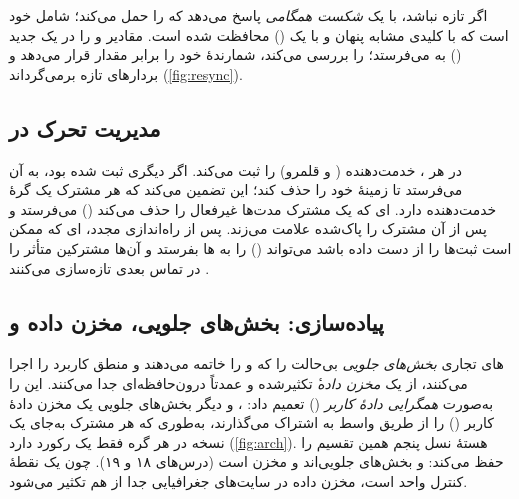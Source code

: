 \documentclass[11pt,a4paper]{article}
\begin{document}
اگر  تازه نباشد،  با یک \emph{شکست همگامی} پاسخ می‌دهد که  را حمل می‌کند؛ 
شامل  خود  است که با کلیدی مشابه  پنهان و با یک  () محافظت شده است.
 مقادیر  و  را در یک  جدید () به 
می‌فرستد؛   را بررسی می‌کند، شمارندهٔ خود را برابر مقدار  قرار می‌دهد و بردارهای تازه
برمی‌گرداند (\cref{fig:resync}).

\subsection{مدیریت تحرک در }
در هر ،   خدمت‌دهنده ( و قلمرو) را ثبت می‌کند. اگر  دیگری ثبت
شده بود،  به آن  می‌فرستد تا زمینهٔ خود را حذف کند؛ این تضمین می‌کند که هر مشترک یک گرهٔ
خدمت‌دهنده دارد. ای که یک مشترک مدت‌ها غیرفعال را حذف می‌کند  () می‌فرستد و پس از آن
 مشترک را پاک‌شده علامت می‌زند. پس از راه‌اندازی مجدد، ای که ممکن است ثبت‌ها را از دست داده باشد
می‌تواند  () را به ها بفرستد و آن‌ها مشترکین متأثر را در تماس بعدی تازه‌سازی می‌کنند
\cite{ts29272}.

\subsection{پیاده‌سازی: بخش‌های جلویی، مخزن داده و }
های تجاری \emph{بخش‌های جلویی} بی‌حالت را که  و  را خاتمه می‌دهند و منطق کاربرد را
اجرا می‌کنند، از یک \emph{مخزن داده}ٔ تکثیرشده و عمدتاً درون‌حافظه‌ای جدا می‌کنند.  این را به‌صورت
\emph{همگرایی دادهٔ کاربر} () تعمیم داد: ،  و دیگر بخش‌های جلویی یک مخزن دادهٔ کاربر
() را از طریق واسط  به اشتراک می‌گذارند، به‌طوری که هر مشترک به‌جای یک نسخه در هر گره فقط یک رکورد
دارد (\cref{fig:arch}). هستهٔ نسل پنجم همین تقسیم را حفظ می‌کند:  و  بخش‌های جلویی‌اند و
 مخزن است (درس‌های ۱۸ و ۱۹). چون  یک نقطهٔ کنترل واحد است، مخزن داده در سایت‌های جغرافیایی
جدا از هم تکثیر می‌شود.

\begin{acnfigure}
  \caption{نمای کارکردی  با واسط‌های آن و تقسیم بخش جلویی/مخزن داده.}
  \label{fig:arch}
\end{acnfigure}
\end{document}
